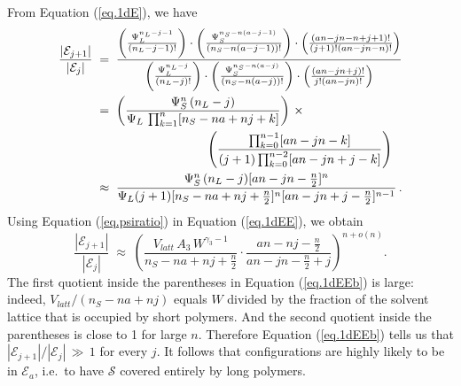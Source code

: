 \documentclass[journal=mamobx,manuscript=article]{achemso}
\begin{document}
From Equation (\ref{eq.1dE}), we have
\begin{align}
   \nonumber
    \frac{|\mathcal{E}_{j+1}|}{|\mathcal{E}_j|} \; & =\;   
    \frac{
     \left(\frac{\Psi_L^{n_{L}-j-1}}{(n_L-j-1)!}\right)\cdot\left(\frac{\Psi_S^{n_S-n(a-j-1)}}{
    (n_S-n(a-j-1))!}\right) \cdot\left( \frac{ (an-jn-n+j+1)!}{(j+1)!(an-jn-n)!} \right)
      }{
 \left(\frac{\Psi_L^{n_{L}-j}}{(n_L-j)!}\right)\cdot\left(\frac{\Psi_S^{n_S-n(a-j)}}{
    (n_S-n(a-j))!}\right) \cdot   \left( \frac{ (an-jn+j)!}{j!(an-jn)!} \right)    }
    \\
    \nonumber
    & = \;   \left( \frac{\Psi_S^n \,(n_L-j) }{\Psi_L \, \prod_{k=1}^n[n_S-na+nj+k]  }\right)  \,\times 
     \\
     \nonumber
    & \hspace{31mm}  \left(   \frac{  \prod_{k=0}^{n-1}[an-jn-k]    }{(j+1)  \prod_{k=0}^{n-2} [an-jn+j-k]   }\right)
    \\
    \label{eq.1dEE}
      & \approx \;   \frac{ \Psi_S^n \,(n_L-j) [an-jn-\frac{n}{2}]^n
         }{   \Psi_L (j+1)  [n_S-na+nj+\frac{n}{2}]^n  [an-jn+j-\frac{n}{2}]^{n-1} }   \,.
\end{align}
Using Equation (\ref{eq.psiratio}) in 
 Equation (\ref{eq.1dEE}), we obtain 
\begin{equation}
   \label{eq.1dEEb}  
    \frac{|\mathcal{E}_{j+1}|}{|\mathcal{E}_j|} \; \approx  \;   
      \left(   \frac{ V_{latt}\, A_3 \,W^{\gamma_3-1} }{n_S-na+nj+\frac{n}{2}} \cdot 
         \frac{ an-nj-\frac{n}{2} }{an-jn-\frac{n}{2}+j}   \right)^{n+o(n)}.
\end{equation}
The first quotient inside the parentheses in Equation (\ref{eq.1dEEb}) is large:  indeed,
$V_{latt}/(n_S-na+nj)$ equals $W$ divided by the fraction of the solvent lattice that is occupied by 
short polymers.  
And the second quotient inside the parentheses is close to 1 for large $n$.   Therefore 
Equation (\ref{eq.1dEEb}) tells us that $|\mathcal{E}_{j+1}|/|\mathcal{E}_j| \,\gg\,1$
for every $j$.  It follows that configurations are highly likely to be in $\mathcal{E}_a$, i.e.\
to have $\mathcal{S}$ covered entirely by long polymers.



\end{document}
